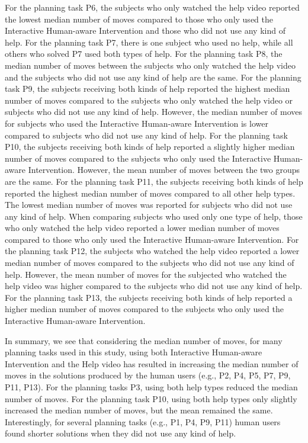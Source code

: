 For the planning task P6, the subjects who only watched the help video reported the lowest median number of moves compared to those who only used the Interactive Human-aware Intervention and those who did not use any kind of help.
For the planning task P7, there is one subject who used no help, while all others who solved P7 used both types of help.
For the planning task P8, the median number of moves between the subjects who only watched the help video and the subjects who did not use any kind of help are the same.
For the planning task P9, the subjects receiving both kinds of help reported the highest median number of moves compared to the subjects who only watched the help video or subjects who did not use any kind of help.
However, the median number of moves for subjects who used the Interactive Human-aware Intervention is lower compared to subjects who did not use any kind of help.
For the planning task P10, the subjects receiving both kinds of help reported a slightly higher median number of moves compared to the subjects who only used the Interactive Human-aware Intervention.
However, the mean number of moves between the two groups are the same.
For the planning task P11,  the subjects receiving both kinds of help reported the highest median number of moves compared to all other help types.
The lowest median number of moves was reported for subjects who did not use any kind of help.
When comparing subjects who used only one type of help, those who only watched the help video reported a lower median number of moves compared to those who only used the Interactive Human-aware Intervention.
For the planning task P12, the subjects who watched the help video reported a lower median number of moves compared to the subjects who did not use any kind of help.
However, the mean number of moves for the subjected who watched the help video was higher compared to the subjects who did not use any kind of help.
For the planning task P13, the subjects receiving both kinds of help reported a higher median number of moves compared to the subjects who only used the Interactive Human-aware Intervention.

In summary, we see that considering the median number of moves, for many planning tasks used in this study, using both Interactive Human-aware Intervention and the Help video has resulted in increasing the median number of moves in the solutions produced by the human users (e.g., P2, P4, P5, P7, P9, P11, P13).
For the planning tasks P3, using both help types reduced the median number of moves.
For the planning task P10, using both help types only slightly increased the median number of moves, but the mean remained the same.
Interestingly, for several planning tasks (e.g., P1, P4, P9, P11) human users found shorter solutions when they did not use any kind of help.


